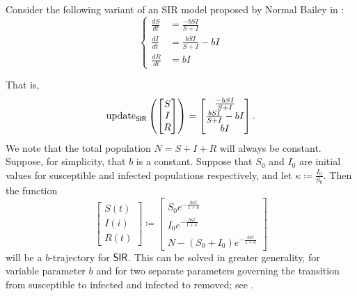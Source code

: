 \documentclass[DynamicalBook]{subfiles}
\begin{document}
%
%
\begin{example}
  Consider the following variant of an SIR model proposed by Normal Bailey in
  \cite{BaileySIR}:
  \[
    \begin{cases}
      \frac{dS}{dt} &= \frac{-b SI}{S + I} \\
      \frac{dI}{dt} &= \frac{b SI}{S + I} - b I \\
      \frac{dR}{dt} &= bI
    \end{cases}
  \]

  That is,
  \[
\mathrm{update}_{\mathsf{SIR}}\left( \begin{bmatrix} S \\ I \\ R\end{bmatrix} \right)
= \begin{bmatrix}\frac{-b SI}{S + I} \\ \frac{b SI}{S + I} - b I\\ bI\end{bmatrix}.
  \]
  We note that the total population $N = S + I + R$ will always be constant.
  Suppose, for simplicity, that $b$ is a constant. Suppose that $S_0$
  and $I_0$ are initial values for susceptible and infected populations
  respectively, and let $\kappa \coloneqq \frac{I_0}{S_0}$. Then the function
\[
\begin{bmatrix} S(t) \\ I(i) \\ R(t) \end{bmatrix}
\coloneqq \begin{bmatrix} S_0 e^{-\frac{b\kappa t}{1 + \kappa}} \\
  I_0e^{-\frac{b\kappa t}{1 + \kappa}} \\ N - (S_0 + I_0)e^{-\frac{b\kappa t}{1 + \kappa}} \end{bmatrix}
\]
will be a $b$-trajectory for $\mathsf{SIR}$. This can be solved in greater
generality, for variable parameter $b$ and for two separate parameters governing the
transition from susceptible to infected and infected to removed; see \cite{SIR_solved}.
\end{example}
\end{document}
